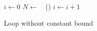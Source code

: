 \begin{figure}
    \begin{algorithmic}
        \State $i \gets 0$
        \State $N \gets\text{ }$ () 
        \State {}
        \State $i \gets i + 1$
        \EndWhile
    \end{algorithmic}
    \caption{Loop without constant bound}
    \label{fig:intro:unroll-nostatic-bound}
\end{figure}
